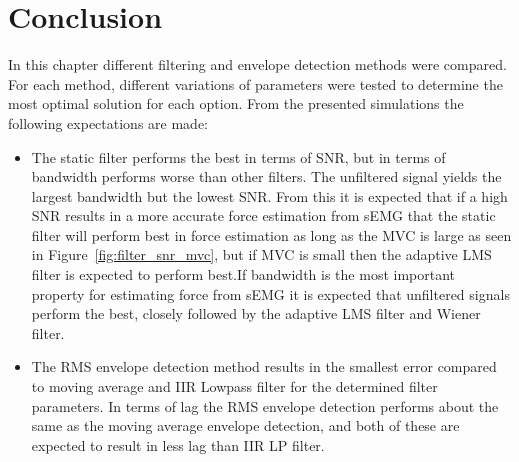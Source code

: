 \section{Conclusion}
In this chapter different filtering and envelope detection methods were compared. For each method, different variations of parameters were tested to determine the most optimal solution for each option.
From the presented simulations the following expectations are made:
\begin{itemize}
    \item The static filter performs the best in terms of SNR, but in terms of bandwidth performs worse than other filters. The unfiltered signal yields the largest bandwidth but the lowest SNR. From this it is expected that if a high SNR results in a more accurate force estimation from sEMG that the static filter will perform best in force estimation as long as the MVC is large as seen in Figure~\ref{fig:filter_snr_mvc}, but if MVC is small then the adaptive LMS filter is expected to perform best.If bandwidth is the most important property for estimating force from sEMG it is expected that unfiltered signals perform the best, closely followed by the adaptive LMS filter and Wiener filter.
    \item The RMS envelope detection method results in the smallest error compared to moving average and IIR Lowpass filter for the determined filter parameters. In terms of lag the RMS envelope detection performs about the same as the moving average envelope detection, and both of these are expected to result in less lag than IIR LP filter.
\end{itemize}
